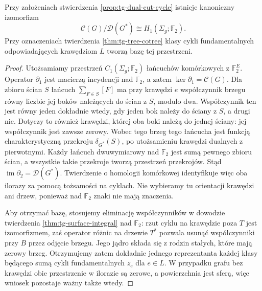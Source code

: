 \begin{stwierdzenie}
\label{prop:tg-dual-cuts-homology}
Przy założeniach stwierdzenia \ref{prop:tg-dual-cut-cycle}
istnieje kanoniczny izomorfizm
\[
\mathcal C(G)/\mathcal D(G^*)\cong H_1(\Sigma_g;\mathbb F_2).
\]
Przy oznaczeniach twierdzenia \ref{thm:tg-tree-cotree}
klasy cykli fundamentalnych odpowiadających krawędziom
$L$ tworzą bazę tej przestrzeni.
\end{stwierdzenie}
\begin{proof}
Utożsamiamy przestrzeń $C_1(\Sigma_g;\mathbb F_2)$
łańcuchów komórkowych z $\mathbb F_2^E$.
Operator $\partial_1$ jest macierzą incydencji nad
$\mathbb F_2$, a zatem $\ker\partial_1=\mathcal C(G)$.
Dla zbioru ścian $S$ łańcuch $\sum_{F\in S}[F]$
ma przy krawędzi $e$ współczynnik brzegu równy
liczbie jej boków należących do ścian z $S$, modulo dwa.
Współczynnik ten jest równy jeden dokładnie wtedy,
gdy jeden bok należy do ściany z $S$, a drugi nie.
Dotyczy to również krawędzi, której oba boki należą
do jednej ściany: jej współczynnik jest zawsze zerowy.
Wobec tego brzeg tego łańcucha jest funkcją
charakterystyczną przekroju $\delta_{G^*}(S)$,
po utożsamieniu krawędzi dualnych z pierwotnymi.
Każdy łańcuch dwuwymiarowy nad $\mathbb F_2$
jest sumą pewnego zbioru ścian, a wszystkie takie
przekroje tworzą przestrzeń przekrojów. Stąd
$\operatorname{im}\partial_2=\mathcal D(G^*)$.
Twierdzenie o homologii komórkowej identyfikuje
więc oba ilorazy za pomocą tożsamości na cyklach.
Nie wybieramy tu orientacji krawędzi ani drzew,
ponieważ nad $\mathbb F_2$ znaki nie mają znaczenia.

Aby otrzymać bazę, stosujemy eliminację współczynników
w dowodzie twierdzenia \ref{thm:tg-surface-integral}
nad $\mathbb F_2$: rzut cyklu na krawędzie poza $T$
jest izomorfizmem, zaś operator różnic na drzewie $T^*$
pozwala usunąć współczynniki przy $B$ przez odjęcie
brzegu. Jego jądro składa się z rodzin stałych,
które mają zerowy brzeg. Otrzymujemy zatem dokładnie
jednego reprezentanta każdej klasy będącego sumą
cykli fundamentalnych $z_e$ dla $e\in L$.
W przypadku grafu bez krawędzi obie przestrzenie
w ilorazie są zerowe, a powierzchnia jest sferą,
więc wniosek pozostaje ważny także wtedy.
\end{proof}

